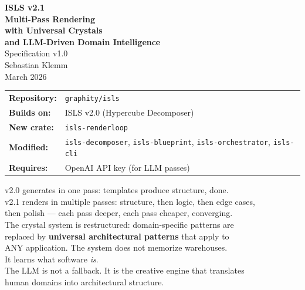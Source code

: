 \documentclass[11pt,a4paper]{article}
\begin{document}
\begin{titlepage}
\begin{center}
\vspace*{1.5cm}
{\Huge\bfseries ISLS v2.1}\\[0.4cm]
{\LARGE\bfseries Multi-Pass Rendering}\\[0.3cm]
{\LARGE\bfseries with Universal Crystals}\\[0.3cm]
{\LARGE\bfseries and LLM-Driven Domain Intelligence}\\[1.2cm]
{\Large Specification v1.0}\\[1.5cm]
{\large Sebastian Klemm}\\[0.3cm]
{\small March 2026}\\[2cm]

\begin{tabular}{ll}
\textbf{Repository:} & \texttt{graphity/isls} \\
\textbf{Builds on:} & ISLS v2.0 (Hypercube Decomposer) \\
\textbf{New crate:} & \texttt{isls-renderloop} \\
\textbf{Modified:} & \texttt{isls-decomposer}, \texttt{isls-blueprint},
  \texttt{isls-orchestrator}, \texttt{isls-cli} \\
\textbf{Requires:} & OpenAI API key (for LLM passes) \\
\end{tabular}

\vfill
{\small
v2.0 generates in one pass: templates produce structure, done.\\
v2.1 renders in multiple passes: structure, then logic, then edge cases,\\
then polish --- each pass deeper, each pass cheaper, converging.\\[0.3cm]
The crystal system is restructured: domain-specific patterns are\\
replaced by \textbf{universal architectural patterns} that apply to\\
ANY application. The system does not memorize warehouses.\\
It learns what software \emph{is}.\\[0.3cm]
The LLM is not a fallback. It is the creative engine that translates\\
human domains into architectural structure.
}
\end{center}
\end{titlepage}

\tableofcontents
\newpage
\end{document}
